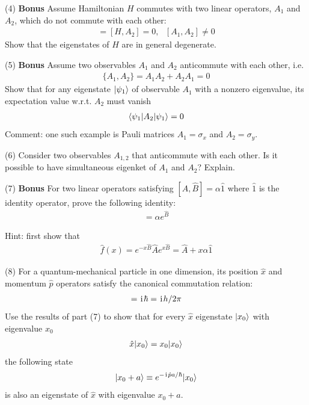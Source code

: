 



(4) \textbf{Bonus} Assume Hamiltonian $H$ commutes with two linear operators, $A_1$ and $A_2$, which do not commute with each other:
\begin{align}
[H,A_1]=[H,A_2]=0,~~~[A_1,A_2]\neq0
\end{align}
Show that the eigenstates of $H$ are in general degenerate. 

(5) \textbf{Bonus} Assume two observables $A_1$ and $A_2$ anticommute with each other, i.e.
\begin{align}
    \{A_1,A_2\}=A_1A_2+A_2A_1=0
\end{align}
Show that for any eigenstate $|{\psi_1}\rangle$ of observable $A_1$ with a nonzero eigenvalue, its expectation value w.r.t. $A_2$ must vanish
\begin{align}
    \langle{\psi_1|A_2|\psi_1}\rangle=0
\end{align}
Comment: one such example is Pauli matrices $A_1=\sigma_x$ and $A_2=\sigma_y$. 

(6) Consider two observables $A_{1,2}$ that anticommute with each other. Is it possible to have simultaneous eigenket of $A_1$ and $A_2$? Explain. 

(7) \textbf{Bonus} For two linear operators satisfying $[\hat A,\hat B]=\alpha\hat 1$ where $\hat 1$ is the identity operator, prove the following identity:
\begin{align}
[\hat A,e^{\hat B}]=\alpha e^{\hat B}
\end{align}

Hint: first show that
\begin{align}
\hat f(x)=e^{-x \hat B}\hat Ae^{x\hat B}=\hat A+x\alpha\hat 1
\end{align}

(8) For a quantum-mechanical particle in one dimension, its position $\hat x$ and momentum $\hat p$ operators satisfy the canonical commutation relation:
\begin{align}
    [\hat x,\hat p]=\imth\hbar=\imth h/2\pi
\end{align}
Use the results of part (7) to show that for every $\hat x$ eigenstate $|{x_0}\rangle$ with eigenvalue $x_0$ 
\begin{align}
    \hat x|{x_0}\rangle=x_0|{x_0}\rangle
\end{align}
the following state
\begin{align}
    |{x_0+a}\rangle\equiv e^{-\hspace{1pt}\mathrm{i}\hspace{1pt}\hat p a/\hbar}|{x_0}\rangle
\end{align}
is also an eigenstate of $\hat x$ with eigenvalue $x_0+a$. 


